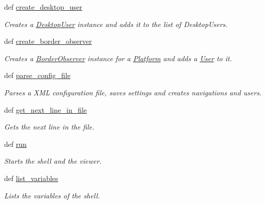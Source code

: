 \begin{DoxyCompactItemize}
def \hyperlink{classlib_1_1ViewingManager_1_1ViewingManager_a28f221fe6cae536691fdbddd32d0c18b}{create\-\_\-desktop\-\_\-user}
\begin{DoxyCompactList}\small\item\em \-Creates a \hyperlink{namespacelib_1_1DesktopUser}{\-Desktop\-User} instance and adds it to the list of \-Desktop\-Users. \end{DoxyCompactList}\item 
def \hyperlink{classlib_1_1ViewingManager_1_1ViewingManager_a7f426835060b3a7b55761ff74272c7ef}{create\-\_\-border\-\_\-observer}
\begin{DoxyCompactList}\small\item\em \-Creates a \hyperlink{namespacelib_1_1BorderObserver}{\-Border\-Observer} instance for a \hyperlink{namespacelib_1_1Platform}{\-Platform} and adds a \hyperlink{namespacelib_1_1User}{\-User} to it. \end{DoxyCompactList}\item 
def \hyperlink{classlib_1_1ViewingManager_1_1ViewingManager_a678ad2fe59d76085059d191f7f886b81}{parse\-\_\-config\-\_\-file}
\begin{DoxyCompactList}\small\item\em \-Parses a \-X\-M\-L configuration file, saves settings and creates navigations and users. \end{DoxyCompactList}\item 
def \hyperlink{classlib_1_1ViewingManager_1_1ViewingManager_acde0772e5f59272a79332538de797ba6}{get\-\_\-next\-\_\-line\-\_\-in\-\_\-file}
\begin{DoxyCompactList}\small\item\em \-Gets the next line in the file. \end{DoxyCompactList}\item 
def \hyperlink{classlib_1_1ViewingManager_1_1ViewingManager_ae7cee170f6f182849b8c8c390de4d3d9}{run}
\begin{DoxyCompactList}\small\item\em \-Starts the shell and the viewer. \end{DoxyCompactList}\item 
def \hyperlink{classlib_1_1ViewingManager_1_1ViewingManager_a101eef4db744f0adabdcfec0e7707b1e}{list\-\_\-variables}
\begin{DoxyCompactList}\small\item\em \-Lists the variables of the shell. \end{DoxyCompactList}\end{DoxyCompactItemize}

